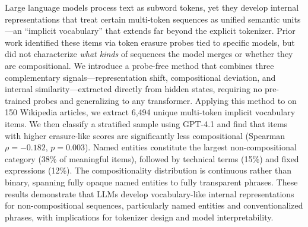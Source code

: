 Large language models process text as subword tokens, yet they develop internal representations that treat certain multi-token sequences as unified semantic units---an ``implicit vocabulary'' that extends far beyond the explicit tokenizer.
Prior work identified these items via token erasure probes tied to specific models, but did not characterize \emph{what kinds} of sequences the model merges or whether they are compositional.
We introduce a probe-free method that combines three complementary signals---representation shift, compositional deviation, and internal similarity---extracted directly from hidden states, requiring no pre-trained probes and generalizing to any transformer.
Applying this method to \mistral on 150 Wikipedia articles, we extract 6{,}494 unique multi-token implicit vocabulary items.
We then classify a stratified sample using GPT-4.1 and find that items with higher erasure-like scores are significantly less compositional (Spearman $\rho = -0.182$, $p = 0.003$).
Named entities constitute the largest non-compositional category (38\% of meaningful items), followed by technical terms (15\%) and fixed expressions (12\%).
The compositionality distribution is continuous rather than binary, spanning fully opaque named entities to fully transparent phrases.
These results demonstrate that LLMs develop vocabulary-like internal representations for non-compositional sequences, particularly named entities and conventionalized phrases, with implications for tokenizer design and model interpretability.
